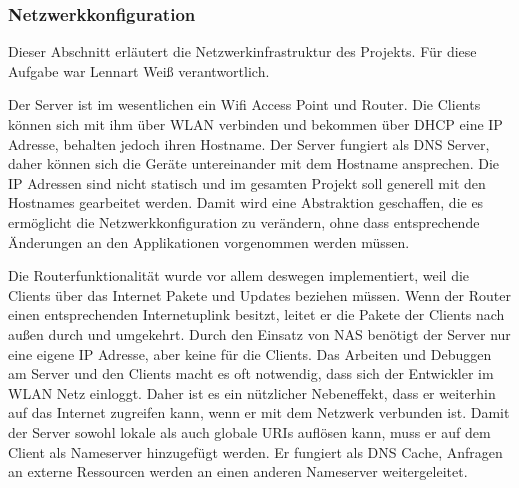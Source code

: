 \subsubsection{Netzwerkkonfiguration}

Dieser Abschnitt erläutert die Netzwerkinfrastruktur des Projekts.
Für diese Aufgabe war Lennart Weiß verantwortlich.

Der Server ist im wesentlichen ein Wifi Access Point und Router.
Die Clients können sich mit ihm über WLAN verbinden und bekommen über DHCP eine IP Adresse, behalten
jedoch ihren Hostname.
Der Server fungiert als DNS Server, daher können sich die Geräte untereinander mit dem Hostname
ansprechen.
Die IP Adressen sind nicht statisch und im gesamten Projekt soll generell mit den Hostnames
gearbeitet werden.
Damit wird eine Abstraktion geschaffen, die es ermöglicht die Netzwerkkonfiguration zu verändern,
ohne dass entsprechende Änderungen an den Applikationen vorgenommen werden müssen.

Die Routerfunktionalität wurde vor allem deswegen implementiert, weil die Clients über das Internet
Pakete und Updates beziehen müssen.
Wenn der Router einen entsprechenden Internetuplink besitzt, leitet er die Pakete der Clients nach
außen durch und umgekehrt.
Durch den Einsatz von NAS benötigt der Server nur eine eigene IP Adresse, aber keine für die
Clients.
Das Arbeiten und Debuggen am Server und den Clients macht es oft notwendig, dass sich der Entwickler
im WLAN Netz einloggt.
Daher ist es ein nützlicher Nebeneffekt, dass er weiterhin auf das Internet zugreifen kann, wenn er
mit dem Netzwerk verbunden ist.
Damit der Server sowohl lokale als auch globale URIs auflösen kann, muss er auf dem Client als
Nameserver hinzugefügt werden.
Er fungiert als DNS Cache, Anfragen an externe Ressourcen werden an einen anderen Nameserver
weitergeleitet.
